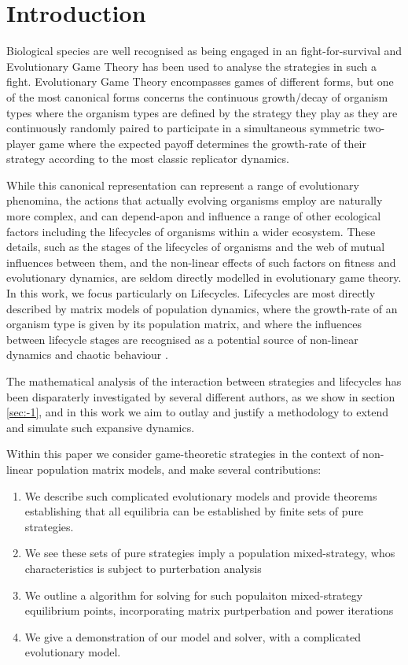 
\section{Introduction}
Biological species are well recognised as being engaged in an fight-for-survival and Evolutionary Game Theory has been used to analyse the strategies in such a fight.
Evolutionary Game Theory encompasses games of different forms, but one of the most canonical forms concerns the continuous growth/decay of organism types where the organism types are defined by the strategy they play as they are continuously randomly paired to participate in a simultaneous symmetric two-player game where the expected payoff determines the growth-rate of their strategy according to the most classic replicator dynamics.\cite{maynard,maynard2,weibull}

While this canonical representation can represent a range of evolutionary phenomina, the actions that actually evolving organisms employ are naturally more complex, and can depend-apon and influence a range of other ecological factors including the lifecycles of organisms within a wider ecosystem.
These details, such as the stages of the lifecycles of organisms and the web of mutual influences between them, and the non-linear effects of such factors on fitness and evolutionary dynamics, are seldom directly modelled in evolutionary game theory.
In this work, we focus particularly on Lifecycles. Lifecycles are most directly described by matrix models of population dynamics, where the growth-rate of an organism type is given by its population matrix, and where the influences between lifecycle stages are recognised as a potential source of non-linear dynamics and chaotic behaviour \cite{doi:10.1080/10236198.2019.1699916, DEVRIES2020108875, population1}.

The mathematical analysis of the interaction between strategies and lifecycles has been disparaterly investigated by several different authors, as we show in section \ref{sec:-1}, and in this work we aim to outlay and justify a methodology to extend and simulate such expansive dynamics.

Within this paper we consider game-theoretic strategies in the context of non-linear population matrix models, and make several contributions:
\begin{enumerate}
\item We describe such complicated evolutionary models and provide theorems establishing that all equilibria can be established by finite sets of pure strategies.
\item We see these sets of pure strategies imply a population mixed-strategy, whos characteristics is subject to purterbation analysis
\item We outline a algorithm for solving for such populaiton mixed-strategy equilibrium points, incorporating matrix purtperbation and power iterations
\item We give a demonstration of our model and solver, with a complicated evolutionary model.
\end{enumerate}

